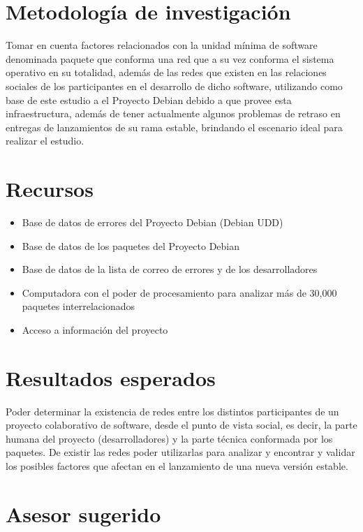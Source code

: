 \documentclass[12pt,titlepage]{report}
\begin{document}
\chapter{Metodología de investigación} %
Tomar en cuenta factores relacionados con la unidad mínima de software
denominada paquete que conforma una red que a su vez conforma el
sistema operativo en su totalidad, además de las redes que existen en
las relaciones sociales de los participantes en el desarrollo de dicho
software, utilizando como base de este estudio a el Proyecto Debian
debido a que provee esta infraestructura, además de tener actualmente
algunos problemas de retraso en entregas de lanzamientos de su rama
estable, brindando el escenario ideal para realizar el estudio.

\chapter{Recursos}
\begin{itemize}
\item Base de datos de errores del Proyecto Debian (Debian UDD)
\item Base de datos de los paquetes del Proyecto Debian
\item Base de datos de la lista de correo de errores y de los
  desarrolladores
\item Computadora con el poder de procesamiento para analizar más de
  30,000 paquetes interrelacionados
\item Acceso a información del proyecto
\end{itemize}

\chapter{Resultados esperados}
Poder determinar la existencia de redes entre los distintos
participantes de un proyecto colaborativo de software, desde el punto
de vista social, es decir, la parte humana del proyecto
(desarrolladores) y la parte técnica conformada por los paquetes. De
existir las redes poder utilizarlas para analizar y encontrar y
validar los posibles factores que afectan en el lanzamiento de una
nueva versión estable.

\chapter{Asesor sugerido}
\end{document}
